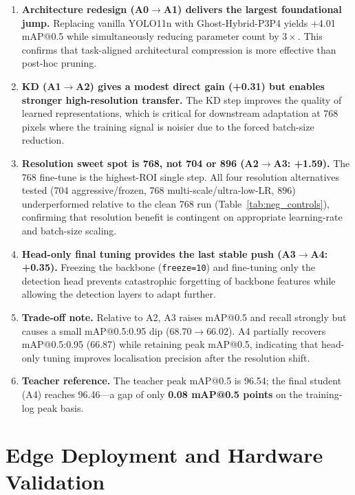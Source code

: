 \documentclass[11pt,a4paper]{article}
\begin{document}
\begin{enumerate}[leftmargin=2em]
  \item \textbf{Architecture redesign (A0$\to$A1) delivers the largest foundational
    jump.} Replacing vanilla YOLO11n with Ghost-Hybrid-P3P4 yields +4.01 mAP@0.5
    while simultaneously reducing parameter count by $3\times$. This confirms that
    task-aligned architectural compression is more effective than post-hoc pruning.

  \item \textbf{KD (A1$\to$A2) gives a modest direct gain (+0.31) but enables stronger
    high-resolution transfer.} The KD step improves the quality of learned
    representations, which is critical for downstream adaptation at 768 pixels where
    the training signal is noisier due to the forced batch-size reduction.

  \item \textbf{Resolution sweet spot is 768, not 704 or 896 (A2$\to$A3: +1.59).}
    The 768 fine-tune is the highest-ROI single step. All four resolution alternatives
    tested (704 aggressive/frozen, 768 multi-scale/ultra-low-LR, 896) underperformed
    relative to the clean 768 run (Table~\ref{tab:neg_controls}), confirming that
    resolution benefit is contingent on appropriate learning-rate and batch-size scaling.

  \item \textbf{Head-only final tuning provides the last stable push (A3$\to$A4:
    +0.35).} Freezing the backbone (\texttt{freeze=10}) and fine-tuning only the
    detection head prevents catastrophic forgetting of backbone features while allowing
    the detection layers to adapt further.

  \item \textbf{Trade-off note.} Relative to A2, A3 raises mAP@0.5 and recall
    strongly but causes a small mAP@0.5:0.95 dip (68.70$\to$66.02). A4 partially
    recovers mAP@0.5:0.95 (66.87) while retaining peak mAP@0.5, indicating that
    head-only tuning improves localisation precision after the resolution shift.

  \item \textbf{Teacher reference.} The teacher peak mAP@0.5 is 96.54; the final
    student (A4) reaches 96.46---a gap of only \textbf{0.08 mAP@0.5 points} on the
    training-log peak basis.
\end{enumerate}

\section{Edge Deployment and Hardware Validation}
\label{sec:edge}
\end{document}

